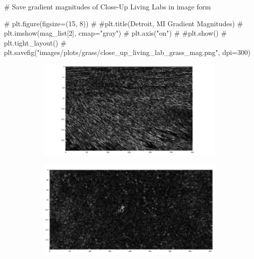 \documentclass[
  letterpaper,
  DIV=11,
  numbers=noendperiod]{scrreprt}
\newenvironment{Shaded}{\begin{snugshade}}{\end{snugshade}}
\newcommand{\CommentTok}[1]{\textcolor[rgb]{0.37,0.37,0.37}{#1}}
\begin{document}
\begin{Shaded}
\begin{Highlighting}[]
\CommentTok{\# Save gradient magnitudes of Close{-}Up Living Labs in image form}

\CommentTok{\# plt.figure(figsize=(15, 8))}
\CommentTok{\# \#plt.title(\textquotesingle{}Detroit, MI Gradient Magnitudes\textquotesingle{})}
\CommentTok{\# plt.imshow(mag\_list[2], cmap="gray")}
\CommentTok{\# plt.axis("on")}
\CommentTok{\# \#plt.show()}
\CommentTok{\# plt.tight\_layout()}
\CommentTok{\# plt.savefig("images/plots/grass/close\_up\_living\_lab\_grass\_mag.png", dpi=300)}
\end{Highlighting}
\end{Shaded}

\begin{figure}

\begin{minipage}{0.33\linewidth}

\begin{figure}[H]

{\centering \includegraphics{images/plots/grass/internet_grass_mag.png}

}


\end{figure}%

\end{minipage}%
%
\begin{minipage}{0.33\linewidth}

\begin{figure}[H]

{\centering \includegraphics{images/plots/grass/aerial_living_lab_grass_mag.png}

}
\end{figure}
\end{minipage}
\end{figure}
\end{document}
